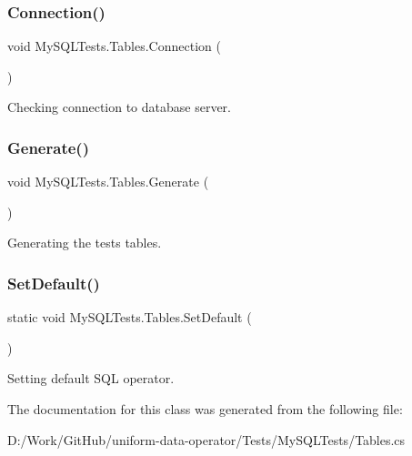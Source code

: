 \subsubsection{\texorpdfstring{Connection()}{Connection()}}
{\footnotesize\ttfamily void My\+S\+Q\+L\+Tests.\+Tables.\+Connection (\begin{DoxyParamCaption}{ }\end{DoxyParamCaption})}



Checking connection to database server. 

\mbox{\label{class_my_s_q_l_tests_1_1_tables_a8b0f4f83fdeedb1cba72d520644b3bd9}} 
\subsubsection{\texorpdfstring{Generate()}{Generate()}}
{\footnotesize\ttfamily void My\+S\+Q\+L\+Tests.\+Tables.\+Generate (\begin{DoxyParamCaption}{ }\end{DoxyParamCaption})}



Generating the test\textquotesingle{}s tables. 

\mbox{\label{class_my_s_q_l_tests_1_1_tables_a2bf30026249403d4a1764d4bc88af649}} 
\subsubsection{\texorpdfstring{Set\+Default()}{SetDefault()}}
{\footnotesize\ttfamily static void My\+S\+Q\+L\+Tests.\+Tables.\+Set\+Default (\begin{DoxyParamCaption}{ }\end{DoxyParamCaption})\hspace{0.3cm}{\ttfamily [static]}}



Setting default S\+QL operator. 



The documentation for this class was generated from the following file\+:\begin{DoxyCompactItemize}
\item 
D\+:/\+Work/\+Git\+Hub/uniform-\/data-\/operator/\+Tests/\+My\+S\+Q\+L\+Tests/Tables.\+cs\end{DoxyCompactItemize}
